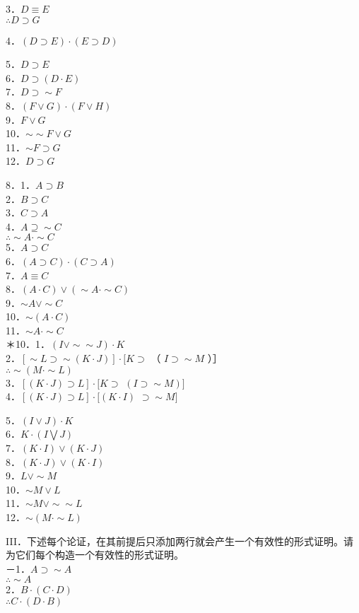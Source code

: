 3．$D \equiv E$\\
$\therefore D \supset G$

4．$(D \supset E) \cdot(E \supset D)$

5．$D \supset E$\\
6．$D \supset(D \cdot E)$\\
7．$D \supset \sim F$\\
8．$(F \vee G) \cdot(F \vee H)$\\
9．$F \vee G$\\
10．$\sim \sim F \vee G$\\
11．$\sim F \supset G$\\
12．$D \supset G$

8．1．$A \supset B$\\
2．$B \supset C$\\
3．$C \supset A$\\
4．$A \supseteq \sim C$\\
$\therefore \sim A \cdot \sim C$\\
5．$A \supset C$\\
6．$(A \supset C) \cdot(C \supset A)$\\
7．$A \equiv C$\\
8．$(A \cdot C) \vee(\sim A \cdot \sim C)$\\
9．$\sim A \vee \sim C$\\
10．$\sim(A \cdot C)$\\
11．$\sim A \cdot \sim C$\\
＊10．1．$(I \vee \sim \sim J) \cdot K$\\
2．$[\sim L \supset \sim(K \cdot J)] \cdot[K \supset$ （ $I \supset \sim M$ ）］\\
$\therefore \sim(M \cdot \sim L)$\\
3．$[(K \cdot J) \supset L] \cdot[K \supset$ $(I \supset \sim M)]$\\
4．$[(K \cdot J) \supset L] \cdot[(K \cdot I)$ $\supset \sim M]$

5．$(I \vee J) \cdot K$\\
6．$K \cdot(I \bigvee J)$\\
7．$(K \cdot I) \vee(K \cdot J)$\\
8．$(K \cdot J) \vee(K \cdot I)$\\
9．$L \vee \sim M$\\
10．$\sim M \vee L$\\
11．$\sim M \vee \sim \sim L$\\
12．$\sim(M \cdot \sim L)$

III．下述每个论证，在其前提后只添加两行就会产生一个有效性的形式证明。请为它们每个构造一个有效性的形式证明。\\
－1．$A \supset \sim A$\\
$\therefore \sim A$\\
2．$B \cdot(C \cdot D)$\\
$\therefore C \cdot(D \cdot B)$


